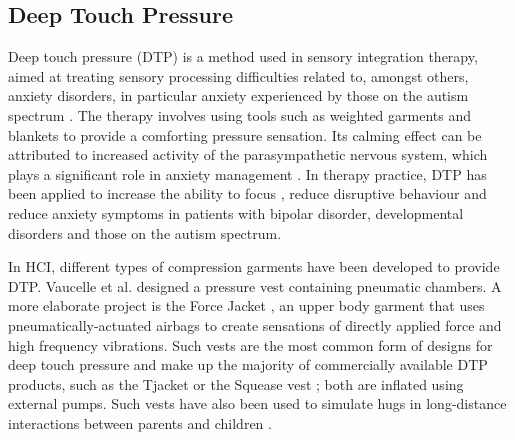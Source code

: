 \subsection*{Deep Touch Pressure}

Deep touch pressure (DTP) is a method used in sensory integration therapy, aimed at treating sensory processing difficulties related to, amongst others, anxiety disorders, in particular anxiety experienced by those on the autism spectrum \cite{hsin-yung_chen_physiological_2013, grandin_calming_1992, krauss_effects_1987}. The therapy involves using tools such as weighted garments and blankets to provide a comforting pressure sensation. Its calming effect can be attributed to increased activity of the parasympathetic nervous system, which plays a significant role in anxiety management \cite{hsin-yung_chen_physiological_2013}. In therapy practice, DTP has been applied to increase the ability to focus \cite{fertel-daly_effects_2001}, reduce disruptive behaviour \cite{quigley_effects_2011} and reduce anxiety symptoms \cite{grandin_calming_1992} in patients with bipolar disorder, developmental disorders and those on the autism spectrum.

In HCI, different types of compression garments have been developed to provide DTP. Vaucelle et al. \cite{vaucelle_design_2009} designed a pressure vest containing pneumatic chambers. A more elaborate project is the Force Jacket \cite{delazio_force_2018}, an upper body garment that uses pneumatically-actuated airbags to create sensations of directly applied force and high frequency vibrations. Such vests are the most common form of designs for deep touch pressure and make up the majority of commercially available DTP products, such as the Tjacket \cite{ltd_tjacket_2020} or the Squease vest \cite{ltd_squease_2014}; both are inflated using external pumps. Such vests have also been used to simulate hugs in long-distance interactions between parents and children \cite{teh_huggy_2009}.


